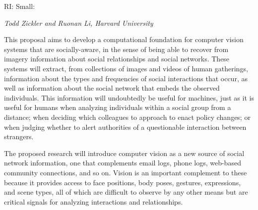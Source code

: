 \pagestyle{empty}

\noindent\textsf{RI: Small:}\vspace{0.9ex}\\

\vspace{1.3ex}
\noindent \textsf{\large \em Todd Zickler and Ruonan Li, Harvard University}
\vspace{2.5ex}


\noindent This proposal aims to develop a computational foundation for computer vision systems that are socially-aware, in the sense of being able to recover from imagery information about social relationships and social networks. These systems will extract, from collections of images and videos of human gatherings, information about the types and frequencies of social interactions that occur, as well as information about the social network that embeds the observed individuals. This information will undoubtedly be useful for machines, just as it is useful for humans when analyzing individuals within a social group from a distance; when deciding which colleagues to approach to enact policy changes; or when judging whether to alert authorities of a questionable interaction between strangers.


The proposed research will introduce computer vision as a new source of social network information, one that complements email logs, phone logs, web-based community connections, and so on. Vision is an important complement to these because it provides access to face positions, body poses, gestures, expressions, and scene types, all of which are difficult to observe by any other means but are critical signals for analyzing interactions and relationships.


